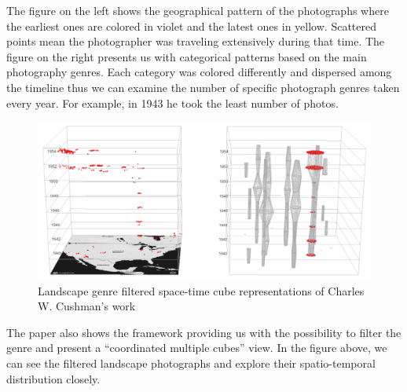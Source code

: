 The figure on the left shows the geographical pattern of the photographs where the earliest ones are colored in violet and the latest ones in
yellow. Scattered points mean the photographer was traveling extensively during that time. The figure on the right presents us with
categorical patterns based on the main photography genres. Each category was colored differently and dispersed among the timeline thus we can
examine the number of specific photograph genres taken every year. For example, in 1943 he took the least number of photos.

\clearpage

\begin{figure}[hbt!]
    \begin{center}
        \includegraphics[width=\textwidth]{graphics/2-literature-review/artist3}
    \end{center}
    \caption{Landscape genre filtered space-time cube representations of Charles W. Cushman's work}
    \label{fig:figure3.artist}
\end{figure}

The paper also shows the framework providing us with the possibility to filter the genre and present a “coordinated multiple cubes” view. In
the figure above, we can see the filtered landscape photographs and explore their spatio-temporal distribution closely.
